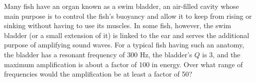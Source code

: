 
Many fish have an organ known as a swim bladder, an
air-filled cavity whose main purpose is to control the
fish's buoyancy and allow it to keep from rising or sinking
without having to use its muscles. In some fish, however,
the swim bladder (or a small extension of it) is linked to
the ear and serves the additional purpose of amplifying
sound waves. For a typical fish having such an anatomy, the
bladder has a resonant frequency of 300 Hz, the bladder's
$Q$ is 3, and the maximum amplification is about a factor of
100 in energy. Over what range of frequencies would the
amplification be at least a factor of 50?
